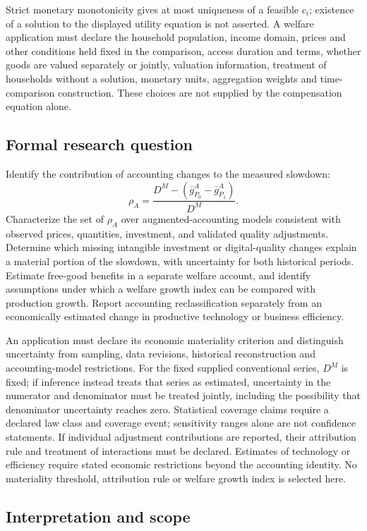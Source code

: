 \documentclass[11pt,a4paper]{article}
\begin{document}
Strict monetary monotonicity gives at most uniqueness of a feasible $c_i$; existence of a solution to the displayed utility equation is not asserted. A welfare application must declare the household population, income domain, prices and other conditions held fixed in the comparison, access duration and terms, whether goods are valued separately or jointly, valuation information, treatment of households without a solution, monetary units, aggregation weights and time-comparison construction. These choices are not supplied by the compensation equation alone.

\subsection*{Formal research question}

Identify the contribution of accounting changes to the measured slowdown:
\[
\rho_A=\frac{D^M-(\bar g_{P_0}^A-\bar g_{P_1}^A)}{D^M}.
\]
Characterize the set of $\rho_A$ over augmented-accounting models consistent with observed prices, quantities, investment, and validated quality adjustments. Determine which missing intangible investment or digital-quality changes explain a material portion of the slowdown, with uncertainty for both historical periods. Estimate free-good benefits in a separate welfare account, and identify assumptions under which a welfare growth index can be compared with production growth. Report accounting reclassification separately from an economically estimated change in productive technology or business efficiency.

An application must declare its economic materiality criterion and distinguish uncertainty from sampling, data revisions, historical reconstruction and accounting-model restrictions. For the fixed supplied conventional series, $D^M$ is fixed; if inference instead treats that series as estimated, uncertainty in the numerator and denominator must be treated jointly, including the possibility that denominator uncertainty reaches zero. Statistical coverage claims require a declared law class and coverage event; sensitivity ranges alone are not confidence statements. If individual adjustment contributions are reported, their attribution rule and treatment of interactions must be declared. Estimates of technology or efficiency require stated economic restrictions beyond the accounting identity. No materiality threshold, attribution rule or welfare growth index is selected here.

\subsection*{Interpretation and scope}
\end{document}
